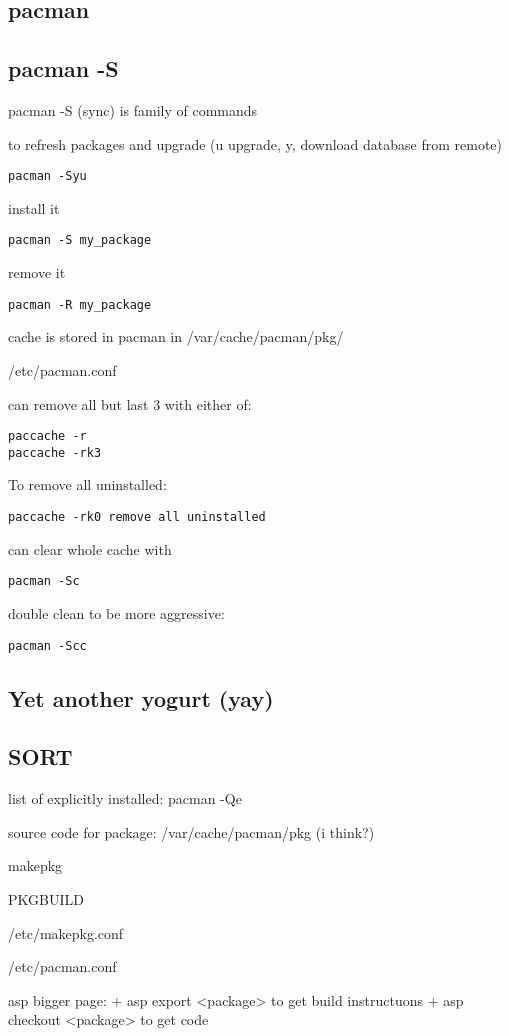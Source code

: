 
\subsection{pacman}
\subsection{pacman -S}


pacman -S (sync) is family of commands



to refresh packages and upgrade (u upgrade, y, download database from remote)

\begin{verbatim}
pacman -Syu
\end{verbatim}


install it
\begin{verbatim}
pacman -S my_package
\end{verbatim}

remove it
\begin{verbatim}
pacman -R my_package
\end{verbatim}


cache is stored in pacman in /var/cache/pacman/pkg/

/etc/pacman.conf

can remove all but last 3 with either of:

\begin{verbatim}
paccache -r
paccache -rk3
\end{verbatim}

To remove all uninstalled:
\begin{verbatim}
paccache -rk0 remove all uninstalled
\end{verbatim}

can clear whole cache with
\begin{verbatim}
pacman -Sc
\end{verbatim}

double clean to be more aggressive:
\begin{verbatim}
pacman -Scc
\end{verbatim}

\subsection{Yet another yogurt (yay)}


\subsection{SORT}

list of explicitly installed: pacman -Qe

source code for package: /var/cache/pacman/pkg (i think?)

makepkg

PKGBUILD

/etc/makepkg.conf

/etc/pacman.conf


asp bigger page:
+ asp export <package> to get build instructuons
+ asp checkout <package> to get code
